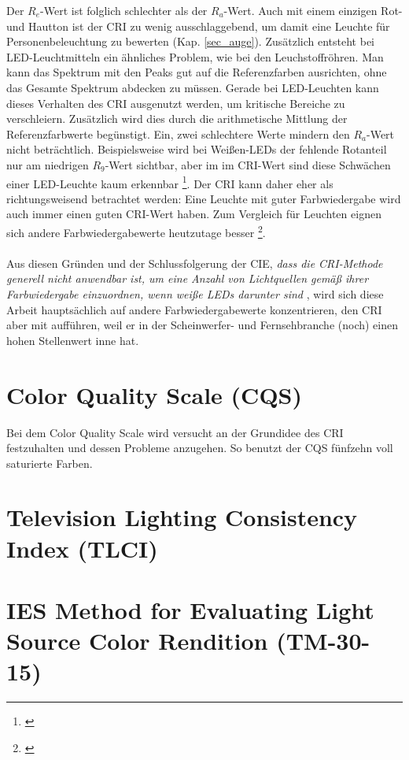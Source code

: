 Der $R_{e}$-Wert ist folglich schlechter als der $R_{a}$-Wert. Auch mit einem einzigen Rot- und Hautton ist der CRI zu wenig ausschlaggebend, um damit eine Leuchte für Personenbeleuchtung zu bewerten (Kap. \ref{sec_auge}). Zusätzlich entsteht bei LED-Leuchtmitteln ein ähnliches Problem, wie bei den Leuchstoffröhren. Man kann das Spektrum mit den Peaks gut auf die Referenzfarben ausrichten, ohne das Gesamte Spektrum abdecken zu müssen. Gerade bei LED-Leuchten kann dieses Verhalten des CRI ausgenutzt werden, um kritische Bereiche zu verschleiern. Zusätzlich wird dies durch die arithmetische Mittlung der Referenzfarbwerte begünstigt. Ein, zwei schlechtere Werte mindern den $R_{a}$-Wert nicht beträchtlich. Beispielsweise wird bei Weißen-LEDs  der fehlende Rotanteil nur am niedrigen $R_{9}$-Wert sichtbar, aber im im CRI-Wert sind diese Schwächen einer LED-Leuchte kaum erkennbar \footnote{\cite{davis_ohno}}. Der CRI kann daher eher als richtungsweisend betrachtet werden: Eine Leuchte mit guter Farbwiedergabe wird auch immer einen guten CRI-Wert haben. Zum Vergleich für Leuchten eignen sich andere Farbwiedergabewerte heutzutage besser \footnote{\cite{production partner}}.\\\\
Aus diesen Gründen und der Schlussfolgerung der CIE, \emph{\glqq dass die CRI-Methode generell nicht anwendbar ist, um eine Anzahl von Lichtquellen gemäß ihrer Farbwiedergabe einzuordnen, wenn weiße LEDs darunter sind\grqq} \citep[VI]{CIE}, wird sich diese Arbeit hauptsächlich auf andere Farbwiedergabewerte konzentrieren, den CRI aber mit aufführen, weil er in der Scheinwerfer- und Fernsehbranche (noch) einen hohen Stellenwert inne hat.





\section{Color Quality Scale (CQS)} \label{sec_cqs}

Bei dem Color Quality Scale wird versucht an der Grundidee des CRI festzuhalten und  dessen Probleme anzugehen. So benutzt der CQS fünfzehn voll saturierte Farben.

\section{Television Lighting Consistency Index (TLCI)} \label{sec_tlci}

\section{IES Method for Evaluating Light Source Color Rendition (TM-30-15)} \label{sec_tm30}

